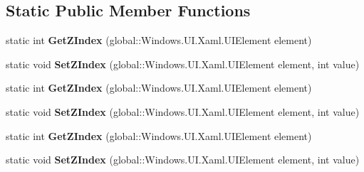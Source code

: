 \subsection*{Static Public Member Functions}
\begin{DoxyCompactItemize}
\item 
\mbox{\label{class_windows_1_1_u_i_1_1_xaml_1_1_controls_1_1_canvas_a1f3123570fbf5432d658782b43c3c313}} 
static int {\bfseries Get\+Z\+Index} (global\+::\+Windows.\+U\+I.\+Xaml.\+U\+I\+Element element)
\item 
\mbox{\label{class_windows_1_1_u_i_1_1_xaml_1_1_controls_1_1_canvas_a05634b687bd468e6302393865f7f4d9c}} 
static void {\bfseries Set\+Z\+Index} (global\+::\+Windows.\+U\+I.\+Xaml.\+U\+I\+Element element, int value)
\item 
\mbox{\label{class_windows_1_1_u_i_1_1_xaml_1_1_controls_1_1_canvas_a1f3123570fbf5432d658782b43c3c313}} 
static int {\bfseries Get\+Z\+Index} (global\+::\+Windows.\+U\+I.\+Xaml.\+U\+I\+Element element)
\item 
\mbox{\label{class_windows_1_1_u_i_1_1_xaml_1_1_controls_1_1_canvas_a05634b687bd468e6302393865f7f4d9c}} 
static void {\bfseries Set\+Z\+Index} (global\+::\+Windows.\+U\+I.\+Xaml.\+U\+I\+Element element, int value)
\item 
\mbox{\label{class_windows_1_1_u_i_1_1_xaml_1_1_controls_1_1_canvas_a1f3123570fbf5432d658782b43c3c313}} 
static int {\bfseries Get\+Z\+Index} (global\+::\+Windows.\+U\+I.\+Xaml.\+U\+I\+Element element)
\item 
\mbox{\label{class_windows_1_1_u_i_1_1_xaml_1_1_controls_1_1_canvas_a05634b687bd468e6302393865f7f4d9c}} 
static void {\bfseries Set\+Z\+Index} (global\+::\+Windows.\+U\+I.\+Xaml.\+U\+I\+Element element, int value)
\item 
\mbox{\label{class_windows_1_1_u_i_1_1_xaml_1_1_controls_1_1_canvas_a1f3123570fbf5432d658782b43c3c313}} 

\end{DoxyCompactItemize}
